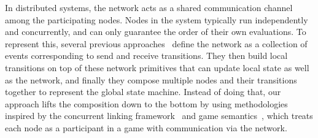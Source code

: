 In distributed systems, the network acts as a shared communication channel among the participating nodes.
Nodes in the system typically run independently and concurrently, and can only guarantee the order of their own evaluations.
To represent this, several previous approaches~\cite{verdi, disel}
define the network as a collection of events corresponding to send and receive transitions.
They then build local transitions on top of these network primitives that can update local state as well as the network,
and finally they compose multiple nodes and their transitions together to represent the global state machine.
Instead of doing that, our approach lifts the composition down to the bottom by using methodologies
inspired by the concurrent linking framework~\cite{concurrency} and game semantics~\cite{gsinvite},
which treats each node as a participant in a game with communication via the network.

